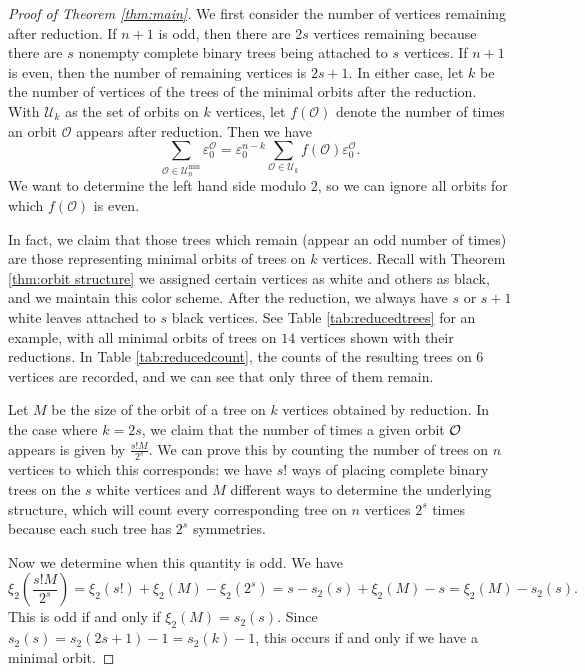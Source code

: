 \begin{proof}[Proof of Theorem \ref{thm:main}]
    We first consider the number of vertices remaining after reduction. If $n+1$ is odd, then there are $2s$ vertices remaining because there are $s$ nonempty complete binary trees being attached to $s$ vertices. If $n+1$ is even, then the number of remaining vertices is $2s+1$. In either case, let $k$ be the number of vertices of the trees of the minimal orbits after the reduction. With $\mathcal{U}_k$ as the set of orbits on $k$ vertices, let $f(\mathcal{O})$ denote the number of times an orbit $\mathcal{O}$ appears after reduction. Then we have
    \[\sum_{\mathcal{O}\in\mathcal{U}_n^{\text{min}}}\varepsilon^{\mathcal{O}}_0 = \varepsilon_0^{n-k}\sum_{\mathcal{O}\in \mathcal{U}_k}f(\mathcal{O})\varepsilon^{\mathcal{O}}_0.\]
    We want to determine the left hand side modulo $2$, so we can ignore all orbits for which $f(\mathcal{O})$ is even.
    
    In fact, we claim that those trees which remain (appear an odd number of times) are those representing minimal orbits of trees on $k$ vertices. Recall with Theorem \ref{thm:orbit structure} we assigned certain vertices as white and others as black, and we maintain this color scheme. After the reduction, we always have $s$ or $s+1$ white leaves attached to $s$ black vertices. See Table \ref{tab:reducedtrees} for an example, with all minimal orbits of trees on $14$ vertices shown with their reductions. In Table \ref{tab:reducedcount}, the counts of the resulting trees on $6$ vertices are recorded, and we can see that only three of them remain.
    
    
    
    Let $M$ be the size of the orbit of a tree on $k$ vertices obtained by reduction. In the case where $k=2s$, we claim that the number of times a given orbit $\mathcal{O}$ appears is given by $\frac{s!M}{2^s}$. We can prove this by counting the number of trees on $n$ vertices to which this corresponds: we have $s!$ ways of placing complete binary trees on the $s$ white vertices and $M$ different ways to determine the underlying structure, which will count every corresponding tree on $n$ vertices $2^s$ times because each such tree has $2^s$ symmetries.
    
    Now we determine when this quantity is odd. We have
    \[\xi_2\left(\frac{s!M}{2^s}\right)=\xi_2(s!)+\xi_2(M)-\xi_2(2^s)=s-s_2(s)+\xi_2(M)-s=\xi_2(M)-s_2(s).\]
    This is odd if and only if $\xi_2(M)=s_2(s)$. Since $s_2(s)=s_2(2s+1)-1=s_2(k)-1$, this occurs if and only if we have a minimal orbit.
    

\end{proof}
